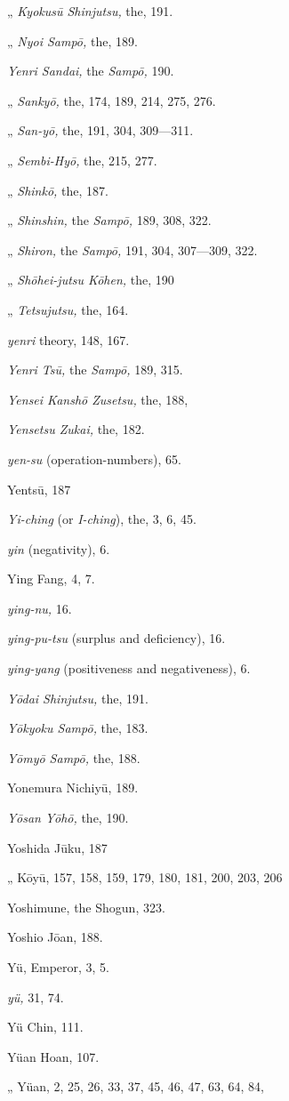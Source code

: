 \documentclass[11pt]{article}
\begin{document}
\quad „ \emph{Kyokusū Shinjutsu,} the, 191.\par
\quad „ \emph{Nyoi Sampō,} the, 189.\par
\emph{Yenri Sandai,} the \emph{Sampō,} 190.\par
\quad „ \emph{Sankyō,} the, 174, 189, 214, 275, 276.\par
\quad „ \emph{San-yō,} the, 191, 304, 309---311.\par
\quad „ \emph{Sembi-Hyō,} the, 215, 277.\par
\quad „ \emph{Shinkō,} the, 187.\par
\quad „ \emph{Shinshin,} the \emph{Sampō,} 189, 308, 322.\par
\quad „ \emph{Shiron,} the \emph{Sampō,} 191, 304, 307---309, 322.\par
\quad „ \emph{Shōhei-jutsu Kōhen,} the, 190\par
\quad „ \emph{Tetsujutsu,} the, 164.\par
\emph{yenri} theory, 148, 167.\par
\emph{Yenri Tsū,} the \emph{Sampō,} 189, 315.\par
\emph{Yensei Kanshō Zusetsu,} the, 188,\par
\emph{Yensetsu Zukai,} the, 182.\par
\emph{yen-su} (operation-numbers), 65.\par
Yentsū, 187\par
\emph{Yi-ching} (or \emph{I-ching}), the, 3, 6, 45.\par
\emph{yin} (negativity), 6.\par
Ying Fang, 4, 7.\par
\emph{ying-nu,} 16.\par
\emph{ying-pu-tsu} (surplus and deficiency), 16.\par
\emph{ying-yang} (positiveness and negativeness), 6.\par
\emph{Yōdai Shinjutsu,} the, 191.\par
\emph{Yōkyoku Sampō,} the, 183.\par
\emph{Yōmyō Sampō,} the, 188.\par
Yonemura Nichiyū, 189.\par
\emph{Yōsan Yōhō,} the, 190.\par
Yoshida Jūku, 187\par
\quad „ Kōyū, 157, 158, 159, 179, 180, 181, 200, 203, 206\par
Yoshimune, the Shogun, 323.\par
Yoshio Jōan, 188.\par
Yü, Emperor, 3, 5.\par
\emph{yü,} 31, 74.\par
Yü Chin, 111.\par
Yüan Hoan, 107.\par
\quad „ Yüan, 2, 25, 26, 33, 37, 45, 46, 47, 63, 64, 84,
\end{document}
